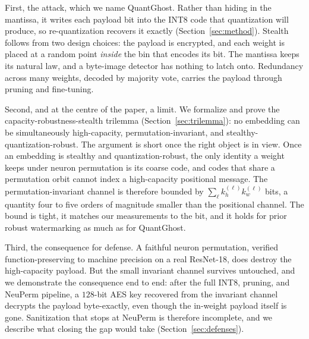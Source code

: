 \documentclass[10pt,journal]{IEEEtran}
\theoremstyle{remark}
\newcommand{\sys}{\mbox{QuantGhost}}
\begin{document}
First, the attack, which we name \sys. Rather than hiding in the mantissa, it writes
each payload bit into the INT8 code that quantization will produce, so re-quantization
recovers it exactly (Section~\ref{sec:method}). Stealth follows from two design choices:
the payload is encrypted, and each weight is placed at a random point \emph{inside} the
bin that encodes its bit. The mantissa keeps its natural law, and a byte-image detector has nothing to
latch onto. Redundancy across many weights, decoded by majority vote, carries the
payload through pruning and fine-tuning.

Second, and at the centre of the paper, a limit. We formalize and prove the
capacity-robustness-stealth trilemma (Section~\ref{sec:trilemma}): no embedding can be
simultaneously high-capacity, permutation-invariant, and stealthy-quantization-robust.
The argument is short once the right object is in view. Once an embedding is stealthy
and quantization-robust, the only identity a weight keeps under neuron permutation is
its coarse code, and codes that share a permutation orbit cannot index a high-capacity
positional message. The permutation-invariant channel is therefore bounded by
$\sum_\ell k_h^{(\ell)} k_w^{(\ell)}$ bits, a quantity four to five orders of magnitude
smaller than the positional channel. The bound is tight, it matches our measurements to
the bit, and it holds for prior robust watermarking as much as for \sys.

Third, the consequence for defense. A faithful neuron permutation, verified
function-preserving to machine precision on a real ResNet-18, does destroy the
high-capacity payload. But the small invariant channel survives untouched, and we
demonstrate the consequence end to end: after the full INT8, pruning, and NeuPerm
pipeline, a $128$-bit AES key recovered from the invariant channel decrypts the payload
byte-exactly, even though the in-weight payload itself is gone. Sanitization that stops
at NeuPerm is therefore incomplete, and we describe what closing the gap would take
(Section~\ref{sec:defenses}).
\end{document}
